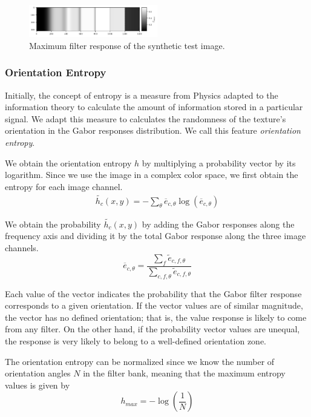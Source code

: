 \documentclass[journal]{IEEEtran}
\begin{document}
\begin{figure}[!ht]
	\includegraphics[width=0.5\textwidth]{max_energy_synth}
    \caption{Maximum filter response of the synthetic test image.}
    \label{fig:max_energy_synth}
\end{figure}

\subsubsection{Orientation Entropy}
Initially, the concept of entropy is a measure from Physics adapted to the information theory to calculate the amount of information stored in a particular signal. We adapt this measure to calculates the randomness of the texture's orientation in the Gabor responses distribution.  We call this feature \textit{orientation entropy}.

We obtain the orientation entropy $h$ by multiplying a probability vector by its logarithm. Since we use the image in a complex color space, we first obtain the entropy for each image channel.
\begin{gather}
    \widetilde{h_c}(x,y) = -\sum_{\theta} \overline{e}_{c, \theta} \log (\overline{e}_{c, \theta}) \label{eq:entropy_orient_ch}
\end{gather}

We obtain the probability $\widetilde{h_c}(x,y)$ by adding the Gabor responses along the frequency axis and dividing it by the total Gabor response along the three image channels.
\begin{equation}
	\overline{e}_{c, \theta} =  \frac{\sum_f \widetilde{e}_{c, f, \theta}}{\sum_{c, f, \theta}\widetilde{e}_{c, f, \theta} }  \label{eq:gabor_energy_ch_orient_prob}
\end{equation}

Each value of the vector indicates the probability that the Gabor filter response corresponds to a given orientation. If the vector values are of similar magnitude, the vector has no defined orientation; that is, the value response is likely to come from any filter. On the other hand, if the probability vector values are unequal, the response is very likely to belong to a well-defined orientation zone.

The orientation entropy can be normalized since we know the number of orientation angles $N$ in the filter bank, meaning that the maximum entropy values is given by 
\begin{equation}
    h_{max} = -\log\left(\frac{1}{N}\right) \label{eq:max_entropy_orient} 
\end{equation}
\end{document}
